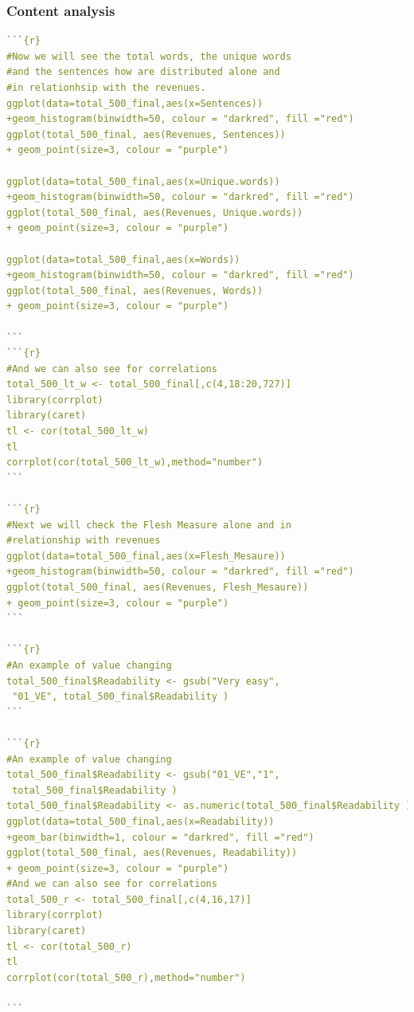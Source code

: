 \documentclass{book}
\begin{document}
\subsubsection{Content analysis}\label{r: van: cont}
\begin{lstlisting}[language=R] 
```{r}
#Now we will see the total words, the unique words 
#and the sentences how are distributed alone and 
#in relationhsip with the revenues.
ggplot(data=total_500_final,aes(x=Sentences))
+geom_histogram(binwidth=50, colour = "darkred", fill ="red")
ggplot(total_500_final, aes(Revenues, Sentences)) 
+ geom_point(size=3, colour = "purple")

ggplot(data=total_500_final,aes(x=Unique.words))
+geom_histogram(binwidth=50, colour = "darkred", fill ="red")
ggplot(total_500_final, aes(Revenues, Unique.words)) 
+ geom_point(size=3, colour = "purple")

ggplot(data=total_500_final,aes(x=Words))
+geom_histogram(binwidth=50, colour = "darkred", fill ="red")
ggplot(total_500_final, aes(Revenues, Words)) 
+ geom_point(size=3, colour = "purple")

```
```{r}
#And we can also see for correlations
total_500_lt_w <- total_500_final[,c(4,18:20,727)]
library(corrplot)
library(caret)
tl <- cor(total_500_lt_w)
tl
corrplot(cor(total_500_lt_w),method="number")
```

```{r}
#Next we will check the Flesh Measure alone and in 
#relationship with revenues
ggplot(data=total_500_final,aes(x=Flesh_Mesaure))
+geom_histogram(binwidth=50, colour = "darkred", fill ="red")
ggplot(total_500_final, aes(Revenues, Flesh_Mesaure)) 
+ geom_point(size=3, colour = "purple")
```

```{r}
#An example of value changing
total_500_final$Readability <- gsub("Very easy",
 "01_VE", total_500_final$Readability )
```

```{r}
#An example of value changing
total_500_final$Readability <- gsub("01_VE","1",
 total_500_final$Readability )
total_500_final$Readability <- as.numeric(total_500_final$Readability )
ggplot(data=total_500_final,aes(x=Readability))
+geom_bar(binwidth=1, colour = "darkred", fill ="red")
ggplot(total_500_final, aes(Revenues, Readability)) 
+ geom_point(size=3, colour = "purple")
#And we can also see for correlations
total_500_r <- total_500_final[,c(4,16,17)]
library(corrplot)
library(caret)
tl <- cor(total_500_r)
tl
corrplot(cor(total_500_r),method="number")

```
 \end{lstlisting} 
\end{document}
